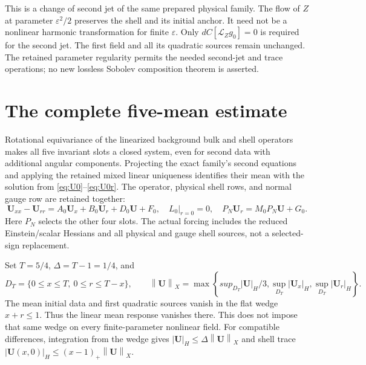 \documentclass[11pt]{article}
\newcommand{\eps}{\varepsilon}
\newcommand{\Lie}{\mathcal L}
\newcommand{\norm}[1]{\left\lVert #1\right\rVert}
\begin{document}
This is a change of second jet of the same prepared physical family.
The flow of $Z$ at parameter $\eps^2/2$ preserves the shell and its
initial anchor. It need not be a nonlinear harmonic transformation for
finite $\eps$. Only $dC[\Lie_Zg_0]=0$ is required for the second jet.
The first field and all its quadratic sources remain unchanged. The
retained parameter regularity permits the needed second-jet and trace
operations; no new lossless Sobolev composition theorem is asserted.

\section{The complete five-mean estimate}

Rotational equivariance of the linearized background bulk and shell
operators makes all five invariant slots a closed system, even for second
data with additional angular components. Projecting the exact family's
second equations and applying the retained mixed linear uniqueness
identifies their mean with the solution from
\eqref{eq:U0}--\eqref{eq:U0r}. The operator, physical shell rows, and
normal gauge row are retained together:
\begin{equation}
 \mathbf U_{xx}-\mathbf U_{rr}
 =A_0\mathbf U_x+B_0\mathbf U_r+D_0\mathbf U+F_0,
 \quad L_0|_{r=0}=0,\quad P_N\mathbf U_r=M_0P_N\mathbf U+G_0.
 \label{eq:meanpde}
\end{equation}
Here $P_N$ selects the other four slots. The actual forcing includes
the reduced Einstein/scalar Hessians and all physical and gauge shell
sources, not a selected-sign replacement.

Set $T=5/4$, $\Delta=T-1=1/4$, and
\begin{equation}
 D_T=\{0\le x\le T,\ 0\le r\le T-x\},\qquad
 \norm{\mathbf U}_X=\max\left\{sup_{D_T}|\mathbf U|_H/3,
      \sup_{D_T}|\mathbf U_x|_H,\sup_{D_T}|\mathbf U_r|_H\right\}.
 \label{eq:norm}
\end{equation}
The mean initial data and first quadratic sources vanish in the flat
wedge $x+r\le1$. Thus the linear mean response vanishes there. This
does not impose that same wedge on every finite-parameter nonlinear field.
For compatible differences, integration from the wedge gives
$|\mathbf U|_H\le\Delta\norm{\mathbf U}_X$ and shell trace
$|\mathbf U(x,0)|_H\le(x-1)_+\norm{\mathbf U}_X$.
\end{document}
